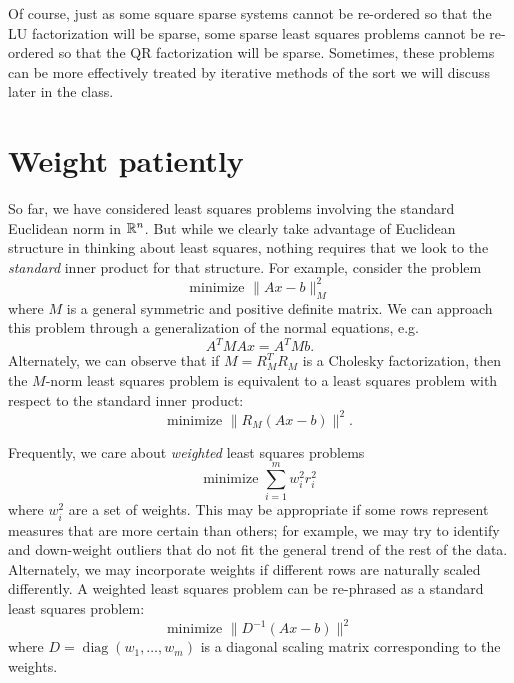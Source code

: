 \documentclass[12pt, leqno]{article}
\begin{document}
Of course, just as some square sparse systems cannot be re-ordered so
that the LU factorization will be sparse, some sparse least squares
problems cannot be re-ordered so that the QR factorization will be
sparse.  Sometimes, these problems can be more effectively treated by
iterative methods of the sort we will discuss later in the class.

\section*{Weight patiently}

So far, we have considered least squares problems involving the
standard Euclidean norm in $\mathbb{R}^n$.  But while we clearly take
advantage of Euclidean structure in thinking about least squares,
nothing requires that we look to the {\em standard} inner product
for that structure.  For example, consider the problem
\[
  \mbox{minimize } \|Ax-b\|_M^2
\]
where $M$ is a general symmetric and positive definite matrix.
We can approach this problem through a generalization of the normal
equations, e.g.
\[
  A^T M A x = A^T M b.
\]
Alternately, we can observe that if $M = R_M^T R_M$ is a Cholesky
factorization, then the $M$-norm least squares problem is
equivalent to a least squares problem with respect to the standard
inner product:
\[
  \mbox{minimize } \|R_M (Ax-b)\|^2.
\]

Frequently, we care about {\em weighted} least squares problems
\[
  \mbox{minimize } \sum_{i=1}^m w_i^2 r_i^2
\]
where $w_i^2$ are a set of weights.  This may be appropriate if some
rows represent measures that are more certain than others; for
example, we may try to identify and down-weight outliers that do not
fit the general trend of the rest of the data.  Alternately, we may
incorporate weights if different rows are naturally scaled
differently.  A weighted least squares problem can be re-phrased as a
standard least squares problem:
\[
  \mbox{minimize } \| D^{-1} (Ax - b) \|^2
\]
where $D = \operatorname{diag}(w_1, \ldots, w_m)$ is a diagonal
scaling matrix corresponding to the weights.
\end{document}
